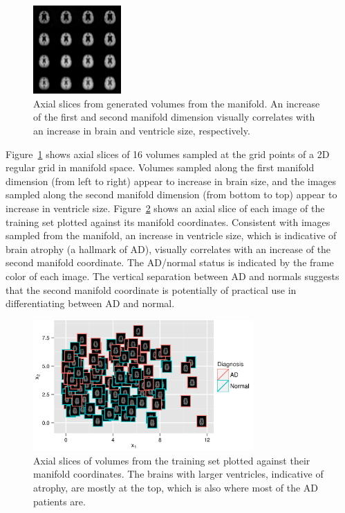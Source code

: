 \begin{figure}[tb]
\centering
\includegraphics[width=0.3\textwidth, trim=0 -4em 0 0]
  {figures/MICCAI2013_sampled2d}

\caption[Axial slices from generated volumes from the manifold]{Axial slices
from generated volumes from the manifold. An increase of the first and second manifold dimension visually correlates with an increase in
brain and ventricle size, respectively.}
\label{fig:generated}
\end{figure}

Figure~\ref{fig:generated} shows axial slices of 16 volumes sampled at the
grid points of a 2D regular grid in manifold space. Volumes sampled along the
first manifold dimension (from left to right) appear to increase in brain size,
and the images sampled along the second manifold dimension (from bottom to top)
appear to increase in ventricle size. Figure~\ref{fig:scatter} shows an axial slice of
each image of the training set plotted against its manifold coordinates.
Consistent with images sampled from the manifold, an increase in ventricle size,
which is indicative of brain atrophy (a hallmark of AD), visually correlates
with an increase of the second manifold coordinate.
The AD/normal status is indicated by the frame color of each image. The vertical
separation between AD and normals suggests that the second manifold coordinate is
potentially of practical use in differentiating between AD and normal.

\begin{figure}[tb] \centering
\includegraphics[width=0.75\textwidth]{figures/MICCAI2013_scatter3}
\caption[Axial slices of volumes from the training set plotted against their
manifold coordinates]{Axial slices of volumes from the training set plotted
against their manifold coordinates. The brains with larger ventricles, indicative of atrophy,
are mostly at the top, which is also where most of the AD patients are.}
\label{fig:scatter}
\end{figure}

